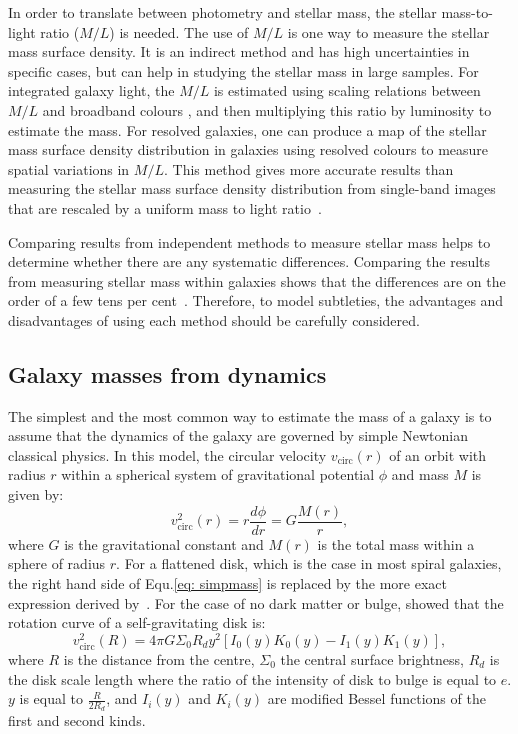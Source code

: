 In order to translate between photometry and stellar mass, the stellar mass-to-light ratio ($M/L$) is needed.
The use of $M/L$ is one way to measure the stellar mass surface density. 
It is an indirect method and has high uncertainties in specific cases, but can help in studying the stellar mass in large samples. 
For integrated galaxy light, the $M/L$ is estimated using scaling relations between $M/L$ and broadband colours \citep[e.g.][]{Bell03}, and then multiplying this ratio by luminosity to estimate the mass.
For resolved galaxies, one can produce a map of the stellar mass surface density distribution in galaxies using resolved colours to measure spatial variations in $M/L$.
This method gives more accurate results than measuring the stellar mass surface density distribution from single-band images that are rescaled by a uniform mass to light ratio~\citep{Zibetti09}.

Comparing results from independent methods to measure stellar mass helps to determine whether there are any systematic differences.
Comparing the results from measuring stellar mass within galaxies shows that the differences are on the order of a few tens per cent~\citep{McLaughlin05}.
Therefore, to model subtleties, the advantages and disadvantages of using each method should be carefully considered. 


\subsection{Galaxy masses from dynamics}

The simplest and the most common way to estimate the mass of a galaxy is to assume that the dynamics of the galaxy are governed by simple Newtonian classical physics.
In this model, the circular velocity $v_{\mathrm{circ}}(r)$ of an orbit with radius $r$ within a spherical system of gravitational potential $\phi$ and mass $M$ is given by:
\begin{equation}
\label{eq: simpmass}
v^2_{\mathrm{circ}}(r)=r\frac{d\phi}{dr} = G\frac{M(r)}{r},
\end{equation}
where $G$ is the gravitational constant and $M(r)$ is the total mass within a sphere of radius $r$. 
For a flattened disk, which is the case in most spiral galaxies, the right hand side of Equ.\ref{eq: simpmass} is replaced by the more exact expression derived by~\cite{Freeman70}. 
For the case of no dark matter or bulge, \cite{Freeman70} showed that the rotation curve of a self-gravitating disk is:
\begin{equation}
v^2_{\mathrm{circ}}(R)= 4\pi G \Sigma_{0}R_{d} y^2[I_0(y)K_0(y) - I_1(y)K_1(y)],
\end{equation}
where $R$ is the distance from the centre, $\Sigma_0$ the central surface brightness, $R_d$ is the disk scale length where the ratio of the intensity of disk to bulge is equal to $e$.
$y$ is equal to $\frac{R}{2R_d}$, and $I_i(y)$ and $K_i(y)$ are  modified Bessel functions of the first and second kinds. 


